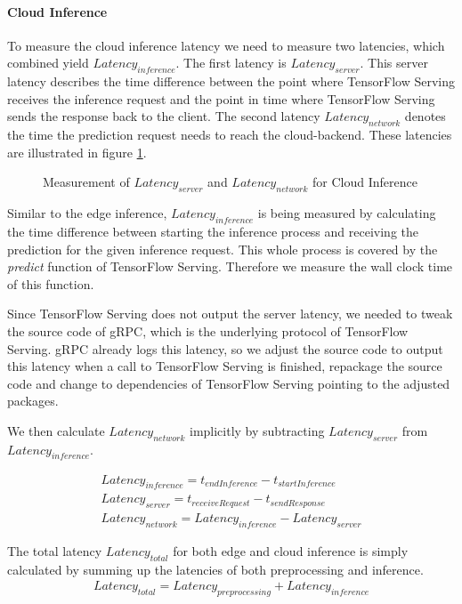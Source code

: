 \paragraph{Cloud Inference}
To measure the cloud inference latency we need to measure two latencies, which combined yield $Latency_{inference}$. The first latency is  $Latency_{server}$. This server latency describes the time difference between the point where TensorFlow Serving receives the inference request and the point in time where TensorFlow Serving sends the response back to the client.
The second latency $Latency_{network}$ denotes the time the prediction request needs to reach the cloud-backend.
These latencies are illustrated in figure \ref{fig:serverLat}.
\begin{figure}[!htb]
\centering

\caption{Measurement of $Latency_{server}$ and $Latency_{network}$ for Cloud Inference}
\label{fig:serverLat}
\end{figure}


Similar to the edge inference, $Latency_{inference}$ is being measured by calculating the time difference between starting the inference process and receiving the prediction for the given inference request. This whole process is covered by the \emph{predict} function of TensorFlow Serving. Therefore we measure the wall clock time of this function.

Since TensorFlow Serving does not output the server latency, we needed to tweak the source code of gRPC, which is the underlying protocol of TensorFlow Serving. gRPC already logs this latency, so we adjust the source code to output this latency when a call to TensorFlow Serving is finished, repackage the source code and change to dependencies of TensorFlow Serving pointing to the adjusted packages.

We then calculate $Latency_{network}$ implicitly by subtracting $Latency_{server}$ from $Latency_{inference}$.

\begin{equation*}
\begin{gathered}
Latency_{inference} = t_{endInference} - t_{startInference}\\
Latency_{server}= t_{receive Request} - t_{send Response}\\
Latency_{network} = Latency_{inference} - Latency_{server}
\end{gathered}
\end{equation*}


The total latency $Latency_{total}$ for both edge and cloud inference is simply calculated by summing up the latencies of both preprocessing and inference.
\begin{equation*}
\begin{gathered}
Latency_{total} = Latency_{preprocessing} + Latency_{inference}
\end{gathered}
\end{equation*}
